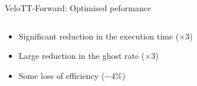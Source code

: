\documentclass[aspectratio=1610]{beamer}
\begin{document}
\begin{frame}{VeloTT-Forward: Optimised peformance}

\begin{columns}
\begin{column}{0.65\textwidth}
\begin{itemize}
  \item Significant reduction in the execution time ($\times$3)
  \item Large reduction in the ghost rate ($\times$3)
  \item Some loss of efficiency ($-4$\%)
\end{itemize}

\bigskip

\begin{mdframed}[linecolor=barcolor]
\begin{center}
\end{center}
\end{mdframed}
\end{column}


\end{columns}
\end{frame}
\end{document}
